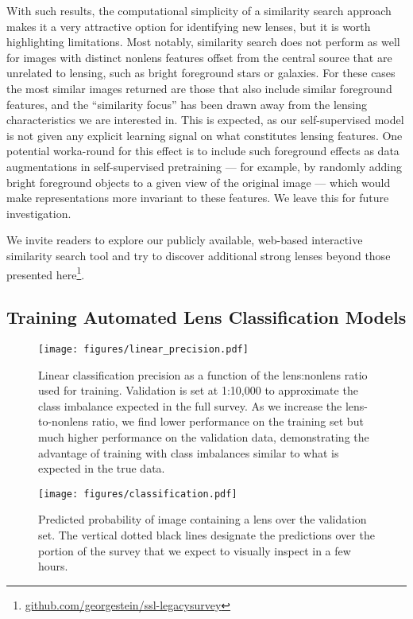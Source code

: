 \documentclass{aastex631}
\begin{document}
With such results, the computational simplicity of a similarity search approach makes it a very attractive option for identifying new lenses, but it is worth highlighting limitations. Most notably, similarity search does not perform as well for images with distinct nonlens features offset from the central source that are unrelated to lensing, such as bright foreground stars or galaxies. For these cases the most similar images returned are those that also include similar foreground features, and the ``similarity focus'' has been drawn away from the lensing characteristics we are interested in. This is expected, as our self-supervised model is not given any explicit learning signal on what constitutes lensing features. One potential worka-round for this effect is to include such foreground effects as data augmentations in self-supervised pretraining --- for example, by randomly adding bright foreground objects to a given view of the original image --- which would make representations more invariant to these features. We leave this for future investigation.

We invite readers to explore our publicly available, web-based interactive similarity search tool and try to discover additional strong lenses beyond those presented here\footnote{\href{https://github.com/georgestein/ssl-legacysurvey}{github.com/georgestein/ssl-legacysurvey}}.

\subsection{Training Automated Lens Classification Models}
\label{sec:lens_classification_results}

\begin{figure}
    \centering
    \texttt{[image: figures/linear\_precision.pdf]}
    \caption{Linear classification precision as a function of the lens:nonlens ratio used for training. Validation is set at 1:10,000 to approximate the class imbalance expected in the full survey. As we increase the lens-to-nonlens ratio, we find lower performance on the training set but much higher performance on the validation data, demonstrating the advantage of training with class imbalances similar to what is expected in the true data.}
    \label{fig:trainingset}
\end{figure}


\begin{figure*}
    \centering
    \texttt{[image: figures/classification.pdf]}
    \caption{Predicted probability of image containing a lens over the validation set. The vertical dotted black lines designate the predictions over the portion of the survey that we expect to visually inspect in a few hours.}
    \label{fig:classification}
\end{figure*}
\end{document}
